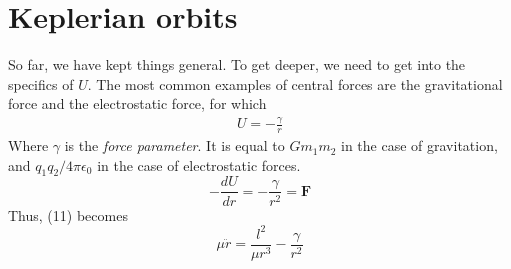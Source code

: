 \documentclass[12pt, letterpaper]{article}
\begin{document}
\section{Keplerian orbits}
So far, we have kept things general. To get deeper, we need to get into the specifics of $U$. The most common examples of 
central forces are the gravitational force and the electrostatic force, for which 
\begin{align}
    U = -\frac{\gamma}{r}
\end{align}
Where $\gamma$ is the \textit{force parameter}. It is equal to $Gm_1m_2$ in the case of gravitation, and $q_1q_2/4\pi\epsilon_0$ in the case of electrostatic forces.
\begin{equation}
    -\frac{dU}{dr}=-\frac{\gamma}{r^2}=\mathbf{F}
\end{equation}
Thus, (11) becomes 
\begin{equation}
    \mu \ddot{r}=\frac{l^2}{\mu r^3}-\frac{\gamma}{r^2}
\end{equation}
\end{document}
